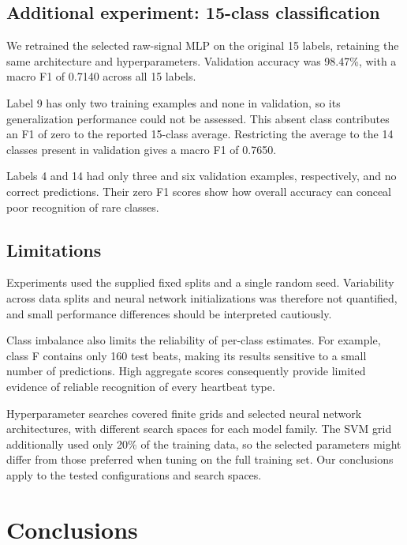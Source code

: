 \documentclass[11pt,oneside,a4paper]{article}
\begin{document}
    \subsection{Additional experiment: 15-class classification}

    We retrained the selected raw-signal MLP on the original
    15 labels, retaining the same architecture and hyperparameters.
    Validation accuracy was 98.47\%, with a macro F1 of 0.7140
    across all 15 labels.

    Label 9 has only two training examples and none in validation,
    so its generalization performance could not be assessed.
    This absent class contributes an F1 of zero to the reported
    15-class average. Restricting the average to the 14 classes
    present in validation gives a macro F1 of 0.7650.

    Labels 4 and 14 had only three and six validation examples,
    respectively, and no correct predictions. Their zero F1
    scores show how overall accuracy can conceal poor recognition
    of rare classes.

    \subsection{Limitations}

    Experiments used the supplied fixed splits and a single
    random seed. Variability across data splits and neural network
    initializations was therefore not quantified, and small
    performance differences should be interpreted cautiously.

    Class imbalance also limits the reliability of per-class
    estimates. For example, class F contains only 160 test beats,
    making its results sensitive to a small number of predictions.
    High aggregate scores consequently provide limited evidence
    of reliable recognition of every heartbeat type.

    Hyperparameter searches covered finite grids and selected
    neural network architectures, with different search spaces
    for each model family. The SVM grid additionally used only
    20\% of the training data, so the selected parameters might
    differ from those preferred when tuning on the full training
    set. Our conclusions apply to the tested configurations
    and search spaces.

    \section{Conclusions}
\end{document}
